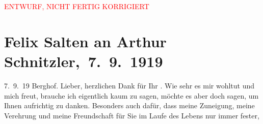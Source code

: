
\begin{center}
            \textcolor{red}{ENTWURF, NICHT FERTIG KORRIGIERT}
                      \end{center}
            
         
         \renewcommand{\erwaehntePersonen}{Personen: Frieda Pollak, Felix Salten, Ottilie Salten, Olga Schnitzler}
         \renewcommand{\erwaehnteOrte}{Orte: Berghof, Salzburg, Unterach am Attersee, Wien}
         \renewcommand{\erwaehnteWerke}{Werke: Felix Saltens fünfzigster Geburtstag, Neue Freie Presse}
               \section[ Felix Salten an Arthur Schnitzler, 7. 9. 1919]{ Felix Salten an Arthur Schnitzler, 7. 9. 1919}\nopagebreak{}\rehead{ }\begin{ledgroupsized}[t]{13cm}\normalsize\beginnumbering \toendnotes[C]{\smallbreak\pagebreak[2]} 
\toendnotes[C]{\smallbreak}\pstart
           \raggedleft{}{\pb}7. 9. 19\pend
           \pstart
           \raggedleft{}Berghof.\pend
           \pstart{}Lieber,\pend\pstart
           herzlichen Dank für Ihr \label{K_L03568-1v}\label{K_L03568-1h}. Wie sehr es mir wohltut
               und mich freut, brauche ich eigentlich kaum zu sagen, möchte es aber doch sagen, um
               Ihnen aufrichtig zu danken. Besonders auch dafür, dass meine Zuneigung, meine
               Verehrung und meine Freundschaft für Sie im Laufe des Lebens nur immer fester,

\end{ledgroupsized}
